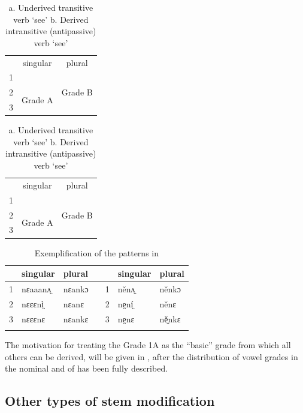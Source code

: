 \documentclass[output=paper
,newtxmath
,modfonts
,nonflat]{langsci/langscibook}
\begin{document}
\begin{table}[!htb]
	\begin{subtable}{0.4\linewidth}
	\caption{Transitive verb}
	\begin{tabular}{|ccc|}
		\hline
		& singular & plural\\
		1 & &\\\cline{1-2}
		2 & \multirow{2}{*}{Grade A} & \multicolumn{1}{|c|}{Grade B}\\ 
		3 & &\multicolumn{1}{|c|}{}\\
		\hline
	\end{tabular}
	\end{subtable}
	\begin{subtable}{0.4\linewidth}
	\caption{Intransitive verb}
	\begin{tabular}{|ccc|}
		\hline
		& singular & plural\\
		1 & &\\\cline{1-2}
		2 & \multirow{2}{*}{Grade A} & \multicolumn{1}{|c|}{Grade B}\\\cline{3-3} 
		3 & &\multicolumn{1}{c|}{}\\
		\hline
	\end{tabular}
	\end{subtable}
\caption{a. Underived transitive verb ‘see’ b. Derived intransitive (antipassive) verb ‘see’}
\label{tab:monich:5}
\end{table}

 
\begin{table}
\begin{tabularx}{\textwidth}{lXXXlXX}
\lsptoprule
 & singular & plural &  &  & singular & plural\\
\midrule
 1 & nɛaaanʌ̤ & nɛankɔ &  & 1 & něnʌ̤ & něnkɔ\\
 2 & nɛɛɛnì̤ & nɛanɛ &  & 2 & ne̤ní̤ & něnɛ\\
 3 & nɛɛɛnɛ & nɛankɛ &  & 3 & ne̤nɛ & ně̤nkɛ\\
\lspbottomrule
\end{tabularx}
\caption{Exemplification of the patterns in }
\label{tab:monich:6}
\end{table}

The motivation for treating the Grade 1A as the “basic” grade from which all others can be derived, will be given in , after the distribution of vowel grades in the nominal and  of  has been fully described.

\subsection{Other types of stem modification} %
\label{sec:monich:3.3}
\end{document}
